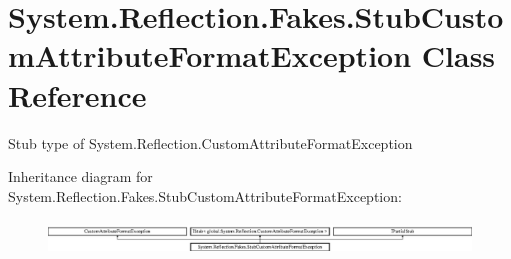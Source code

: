 \hypertarget{class_system_1_1_reflection_1_1_fakes_1_1_stub_custom_attribute_format_exception}{\section{System.\-Reflection.\-Fakes.\-Stub\-Custom\-Attribute\-Format\-Exception Class Reference}
\label{class_system_1_1_reflection_1_1_fakes_1_1_stub_custom_attribute_format_exception}
}


Stub type of System.\-Reflection.\-Custom\-Attribute\-Format\-Exception 


Inheritance diagram for System.\-Reflection.\-Fakes.\-Stub\-Custom\-Attribute\-Format\-Exception\-:\begin{figure}[H]
\begin{center}
\leavevmode
\includegraphics[height=0.942761cm]{class_system_1_1_reflection_1_1_fakes_1_1_stub_custom_attribute_format_exception}
\end{center}
\end{figure}
